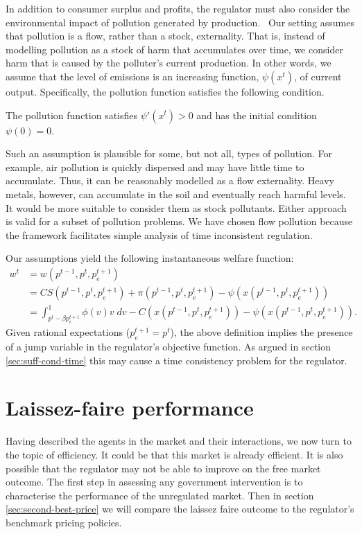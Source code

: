 In addition to consumer surplus and profits, the regulator must also
consider the environmental impact of pollution generated by production. \
Our setting assumes that pollution is a flow, rather than a stock,
externality. That is, instead of modelling pollution as a stock of harm that
accumulates over time, we consider harm that is caused by the polluter's
current production. In other words, we assume that the level of emissions is
an increasing function, $\psi (x^{t})$, of current output. Specifically, the
pollution function satisfies the following condition. 
\begin{ass} \label{dur:ass3} The pollution function satisfies
  $\psi'(x^t) > 0$ and has the initial condition $\psi(0) = 0$.
\end{ass}

Such an assumption is plausible for some, but not all, types of pollution.
For example, air pollution is quickly dispersed and may have little time to
accumulate. Thus, it can be reasonably modelled as a flow externality. Heavy
metals, however, can accumulate in the soil and eventually reach harmful
levels. It would be more suitable to consider them as stock pollutants.
Either approach is valid for a subset of pollution problems. We have chosen
flow pollution because the framework facilitates simple analysis of time
inconsistent regulation.

Our assumptions yield the following instantaneous welfare function: 
\begin{align}
w^{t}& =w(p^{t-1},p^{t},p_{e}^{t+1})  \label{dur:welfare1} \\
& =CS(p^{t-1},p^{t},p_{e}^{t+1})+\pi (p^{t-1},p^{t},p_{e}^{t+1})-\psi \left(
x(p^{t-1},p^{t},p_{e}^{t+1})\right) \\
& =\int_{p^{t}-\beta p_{e}^{t+1}}^{1}\phi
(v)v\;dv-C(x(p^{t-1},p^{t},p_{e}^{t+1}))-\psi (x(p^{t-1},p^{t},p_{e}^{t+1})).
\end{align}
Given rational expectations ($p_{e}^{t+1}=p^{t}$), the above definition
implies the presence of a jump variable in the regulator's objective
function. As argued in section \ref{sec:suff-cond-time} this may cause a
time consistency problem for the regulator.

\section{Laissez-faire performance}

\label{sec:laiss-faire-perf}

Having described the agents in the market and their interactions, we now
turn to the topic of efficiency. It could be that this market is already
efficient. It is also possible that the regulator may not be able to improve
on the free market outcome. The first step in assessing any government
intervention is to characterise the performance of the unregulated market.
Then in section \ref{sec:second-best-price} we will compare the laissez
faire outcome to the regulator's benchmark pricing policies.

